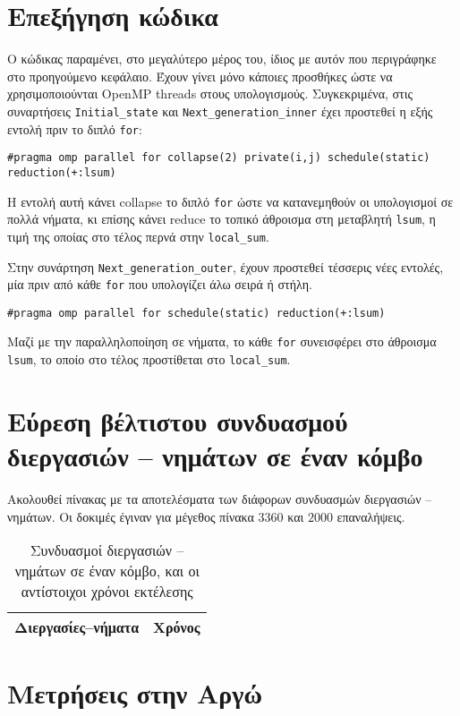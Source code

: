 \section{Επεξήγηση κώδικα}
\begin{multicols}{2}
Ο κώδικας παραμένει, στο μεγαλύτερο μέρος του, ίδιος με αυτόν που περιγράφηκε στο προηγούμενο κεφάλαιο. Έχουν γίνει μόνο κάποιες προσθήκες ώστε να χρησιμοποιούνται OpenMP threads στους υπολογισμούς. Συγκεκριμένα, στις συναρτήσεις \texttt{Initial_state} και \texttt{Next_generation_inner} έχει προστεθεί η εξής εντολή πριν το διπλό \texttt{for}: \\
\end{multicols}

\begin{tcolorbox}
\texttt{#pragma}\texttt{ omp parallel for collapse(2) private(i,j) schedule(static) reduction(+:lsum)}
\end{tcolorbox}
\begin{multicols}{2}
Η εντολή αυτή κάνει collapse  το διπλό \texttt{for} ώστε να κατανεμηθούν οι υπολογισμοί σε πολλά νήματα, κι επίσης κάνει reduce το τοπικό άθροισμα στη μεταβλητή \texttt{lsum}, η τιμή της οποίας στο τέλος περνά στην \texttt{local_sum}. \par

Στην συνάρτηση \texttt{Next_generation_outer}, έχουν προστεθεί τέσσερις νέες εντολές, μία πριν από κάθε \texttt{for} που υπολογίζει άλω σειρά ή στήλη. \\
\end{multicols}

\begin{tcolorbox}
\texttt{#pragma}\texttt{ omp parallel for schedule(static) reduction(+:lsum)}
\end{tcolorbox}
Μαζί με την παραλληλοποίηση σε νήματα, το κάθε \texttt{for} συνεισφέρει στο άθροισμα \texttt{lsum}, το οποίο στο τέλος προστίθεται στο \texttt{local_sum}.

\section{Εύρεση βέλτιστου συνδυασμού διεργασιών -- νημάτων σε έναν κόμβο}

Ακολουθεί πίνακας με τα αποτελέσματα των διάφορων συνδυασμών διεργασιών -- νημάτων. Οι δοκιμές έγιναν για μέγεθος πίνακα $3360$ και $2000$ επαναλήψεις.

\begin{table}[h]
\centering
\begin{tabular}{| c | c | }
\hline
Διεργασίες--νήματα & Χρόνος \\
\hline
\end{tabular}
\caption{Συνδυασμοί διεργασιών -- νημάτων σε έναν κόμβο, και οι αντίστοιχοι χρόνοι εκτέλεσης}
\label{tab:OpenMPOneNode}
\end{table}
\section{Μετρήσεις στην Αργώ}